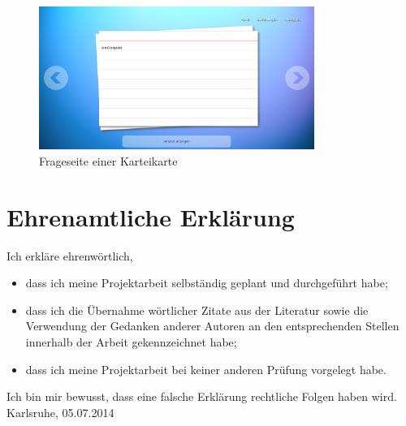 \documentclass{article}
\begin{document}
\begin{figure}[H]
    \centering
    \includegraphics[width=0.8\textwidth]{images/learningscreen-answer.png}
    \caption{Frageseite einer Karteikarte}
    \label{fig:learning-question}
\end{figure}

\section{Ehrenamtliche Erklärung}

Ich erkläre ehrenwörtlich,
\begin{itemize}
    \item dass ich meine Projektarbeit selbständig geplant und durchgeführt habe;
    \item dass ich die Übernahme wörtlicher Zitate aus der Literatur sowie die Verwendung der Gedanken anderer Autoren an den entsprechenden Stellen innerhalb der Arbeit gekennzeichnet habe;
    \item dass ich meine Projektarbeit bei keiner anderen Prüfung
    vorgelegt habe.
\end{itemize}
Ich bin mir bewusst, dass eine falsche Erklärung rechtliche Folgen haben wird. \\

\vspace{1cm}
Karlsruhe, 05.07.2014 
\end{document}
